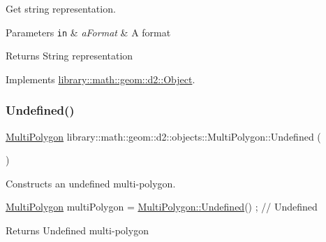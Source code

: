 Get string representation. 


\begin{DoxyParams}[1]{Parameters}
\mbox{\tt in}  & {\em a\+Format} & A format \\
\hline
\end{DoxyParams}
\begin{DoxyReturn}{Returns}
String representation 
\end{DoxyReturn}


Implements \hyperlink{classlibrary_1_1math_1_1geom_1_1d2_1_1_object_acdd76b3637732a249536b609dbe3f0eb}{library\+::math\+::geom\+::d2\+::\+Object}.

\mbox{\label{classlibrary_1_1math_1_1geom_1_1d2_1_1objects_1_1_multi_polygon_a92c7c7ece7479f0ac9a9b75546b69b20}} 
\subsubsection{\texorpdfstring{Undefined()}{Undefined()}}
{\footnotesize\ttfamily \hyperlink{classlibrary_1_1math_1_1geom_1_1d2_1_1objects_1_1_multi_polygon}{Multi\+Polygon} library\+::math\+::geom\+::d2\+::objects\+::\+Multi\+Polygon\+::\+Undefined (\begin{DoxyParamCaption}{ }\end{DoxyParamCaption})\hspace{0.3cm}{\ttfamily [static]}}



Constructs an undefined multi-\/polygon. 


\begin{DoxyCode}
\hyperlink{classlibrary_1_1math_1_1geom_1_1d2_1_1objects_1_1_multi_polygon_a10c2390027c64a8541efde7fcb2b282f}{MultiPolygon} multiPolygon = \hyperlink{classlibrary_1_1math_1_1geom_1_1d2_1_1objects_1_1_multi_polygon_a92c7c7ece7479f0ac9a9b75546b69b20}{MultiPolygon::Undefined}() ; \textcolor{comment}{// Undefined}
\end{DoxyCode}


\begin{DoxyReturn}{Returns}
Undefined multi-\/polygon 
\end{DoxyReturn}
\mbox{\label{classlibrary_1_1math_1_1geom_1_1d2_1_1objects_1_1_multi_polygon_ad27159b10d8cb05d9ed15f1dd2d3de1d}} 
